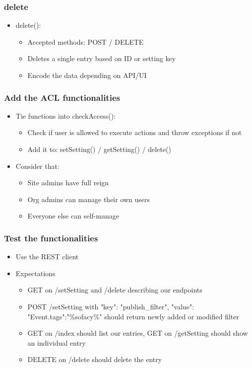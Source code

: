 \begin{frame}
\frametitle{delete}
  \begin{itemize}
    \item delete():
    \begin{itemize}
      \item Accepted methods: POST / DELETE
      \item Deletes a single entry based on ID or setting key
      \item Encode the data depending on API/UI
    \end{itemize}
  \end{itemize}
\end{frame}

\begin{frame}
\frametitle{Add the ACL functionalities}
  \begin{itemize}
    \item Tie functions into checkAccess():
    \begin{itemize}
      \item Check if user is allowed to execute actions and throw exceptions if not
      \item Add it to: setSetting() / getSetting() / delete()
    \end{itemize}
    \item Consider that:
    \begin{itemize}
        \item Site admins have full reign
        \item Org admins can manage their own users
        \item Everyone else can self-manage
    \end{itemize}
  \end{itemize}
\end{frame}


\begin{frame}
  \frametitle{Test the functionalities}
  \begin{itemize}
    \item Use the REST client
    \item Expectations
    \begin{itemize}
      \item GET on /setSetting and /delete describing our endpoints
      \item POST /setSetting with {"key": "publish\_filter", "value": {"Event.tags":"\%sofacy\%"}} should return newly added or modified filter
      \item GET on /index should list our entries, GET on /getSetting should show an individual entry
      \item DELETE on /delete should delete the entry
    \end{itemize}
  \end{itemize}
\end{frame}

